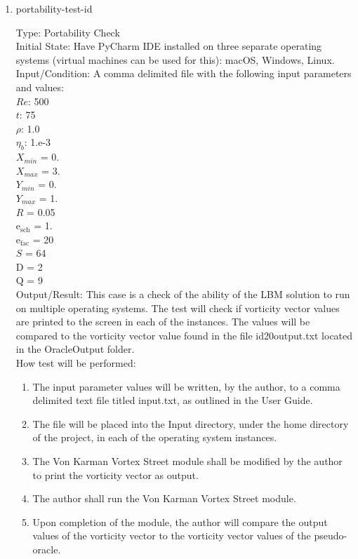 \documentclass[12pt, titlepage]{article}
\newcounter{testcounter} %
\begin{document}
\begin{enumerate}

\item{portability-test-id\thetestcounter \\}

Type: Portability Check\\
					
Initial State: Have PyCharm IDE installed on three separate operating systems
(virtual machines can be used for this): macOS, Windows, Linux. \\
					
Input/Condition: A comma delimited file with the following input parameters and values:\\
$Re$: 500\\
$t$: 75\\
$\rho$: 1.0\\
$\eta_b$: 1.e-3\\
$X_{min}$ = 0.\\
$X_{max}$ = 3.\\
$Y_{min}$ = 0.\\
$Y_{max}$ = 1.\\
$R$ = 0.05\\
$\mathrm{e_{sch}}$ = 1.\\
$\mathrm{e_{fac}}$ = 20\\
$S$ = 64\\
$\mathrm{D}$ = 2\\
$\mathrm{Q}$ = 9\\

					
Output/Result: This case is a check of the ability of the LBM solution to run on
multiple operating systems. The test will check if vorticity vector values are printed to the screen in each of the instances. The values will be compared to the vorticity vector value found in the file id20output.txt located in the OracleOutput folder.\\
					
How test will be performed: 

\begin{enumerate}

\item The input parameter values will be written, by the author, to a comma
delimited text file titled input.txt, as outlined in the User Guide.
\item The file will be placed into the Input directory, under the home directory
of the project, in each of the operating system instances.
\item The Von Karman Vortex Street module shall be modified by the author to
print the vorticity vector as output.
\item The author shall run the Von Karman Vortex Street module.
\item Upon completion of the module, the author will compare the output values
of the vorticity vector to the vorticity vector values of the pseudo-oracle.\\
\end{enumerate}

\end{enumerate}
\end{document}

